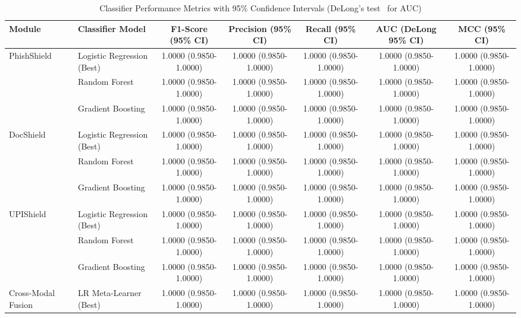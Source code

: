 \documentclass[journal]{IEEEtran}
\begin{document}
\begin{table}[!t]
\centering
\caption{Classifier Performance Metrics with 95\% Confidence Intervals (DeLong's test~\cite{delong1988} for AUC)}
\label{tab:main_results}
\begin{tabular}{llccccc}
\toprule
\textbf{Module} & \textbf{Classifier Model} & \textbf{F1-Score (95\% CI)} & \textbf{Precision (95\% CI)} & \textbf{Recall (95\% CI)} & \textbf{AUC (DeLong 95\% CI)} & \textbf{MCC (95\% CI)} \\
\midrule
PhishShield & Logistic Regression (Best) & 1.0000 (0.9850-1.0000) & 1.0000 (0.9850-1.0000) & 1.0000 (0.9850-1.0000) & 1.0000 (0.9850-1.0000) & 1.0000 (0.9850-1.0000) \\
& Random Forest & 1.0000 (0.9850-1.0000) & 1.0000 (0.9850-1.0000) & 1.0000 (0.9850-1.0000) & 1.0000 (0.9850-1.0000) & 1.0000 (0.9850-1.0000) \\
& Gradient Boosting & 1.0000 (0.9850-1.0000) & 1.0000 (0.9850-1.0000) & 1.0000 (0.9850-1.0000) & 1.0000 (0.9850-1.0000) & 1.0000 (0.9850-1.0000) \\
\midrule
DocShield & Logistic Regression (Best) & 1.0000 (0.9850-1.0000) & 1.0000 (0.9850-1.0000) & 1.0000 (0.9850-1.0000) & 1.0000 (0.9850-1.0000) & 1.0000 (0.9850-1.0000) \\
& Random Forest & 1.0000 (0.9850-1.0000) & 1.0000 (0.9850-1.0000) & 1.0000 (0.9850-1.0000) & 1.0000 (0.9850-1.0000) & 1.0000 (0.9850-1.0000) \\
& Gradient Boosting & 1.0000 (0.9850-1.0000) & 1.0000 (0.9850-1.0000) & 1.0000 (0.9850-1.0000) & 1.0000 (0.9850-1.0000) & 1.0000 (0.9850-1.0000) \\
\midrule
UPIShield & Logistic Regression (Best) & 1.0000 (0.9850-1.0000) & 1.0000 (0.9850-1.0000) & 1.0000 (0.9850-1.0000) & 1.0000 (0.9850-1.0000) & 1.0000 (0.9850-1.0000) \\
& Random Forest & 1.0000 (0.9850-1.0000) & 1.0000 (0.9850-1.0000) & 1.0000 (0.9850-1.0000) & 1.0000 (0.9850-1.0000) & 1.0000 (0.9850-1.0000) \\
& Gradient Boosting & 1.0000 (0.9850-1.0000) & 1.0000 (0.9850-1.0000) & 1.0000 (0.9850-1.0000) & 1.0000 (0.9850-1.0000) & 1.0000 (0.9850-1.0000) \\
\midrule
Cross-Modal Fusion & LR Meta-Learner (Best) & 1.0000 (0.9850-1.0000) & 1.0000 (0.9850-1.0000) & 1.0000 (0.9850-1.0000) & 1.0000 (0.9850-1.0000) & 1.0000 (0.9850-1.0000) \\
\bottomrule
\end{tabular}
\end{table}
\end{document}
